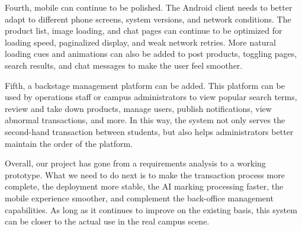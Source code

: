 \documentclass{article}
\begin{document}
Fourth, mobile can continue to be polished. The Android client needs to better adapt to different phone screens, system versions, and network conditions. The product list, image loading, and chat pages can continue to be optimized for loading speed, paginalized display, and weak network retries. More natural loading cues and animations can also be added to post products, toggling pages, search results, and chat messages to make the user feel smoother.

Fifth, a backstage management platform can be added. This platform can be used by operations staff or campus administrators to view popular search terms, review and take down products, manage users, publish notifications, view abnormal transactions, and more. In this way, the system not only serves the second-hand transaction between students, but also helps administrators better maintain the order of the platform.

Overall, our project has gone from a requirements analysis to a working prototype. What we need to do next is to make the transaction process more complete, the deployment more stable, the AI marking processing faster, the mobile experience smoother, and complement the back-office management capabilities. As long as it continues to improve on the existing basis, this system can be closer to the actual use in the real campus scene.
\end{document}
